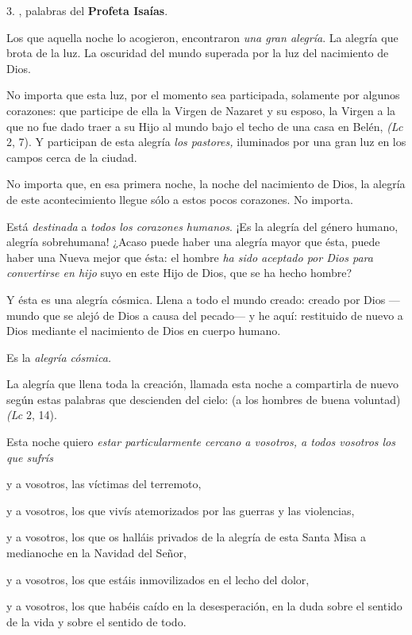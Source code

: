 3. , palabras del \textbf{Profeta Isaías}.

Los que aquella noche lo acogieron, encontraron \emph{una gran alegría}. La alegría que brota de la luz. La oscuridad del mundo superada por la luz del nacimiento de Dios.

No importa que esta luz, por el momento sea participada, solamente por algunos corazones: que participe de ella la Virgen de Nazaret y su esposo, la Virgen a la que no fue dado traer a su Hijo al mundo bajo el techo de una casa en Belén, \emph{(Lc} 2, 7). Y participan de esta alegría \emph{los pastores,} iluminados por una gran luz en los campos cerca de la ciudad.

No importa que, en esa primera noche, la noche del nacimiento de Dios, la alegría de este acontecimiento llegue sólo a estos pocos corazones. No importa.

Está \emph{destinada} a \emph{todos los corazones humanos}. ¡Es la alegría del género humano, alegría sobrehumana! ¿Acaso puede haber una alegría mayor que ésta, puede haber una Nueva mejor que ésta: el hombre \emph{ha sido aceptado por Dios para convertirse en hijo} suyo en este Hijo de Dios, que se ha hecho hombre?

Y ésta es una alegría cósmica. Llena a todo el mundo creado: creado por Dios ---mundo que se alejó de Dios a causa del pecado--- y he aquí: restituido de nuevo a Dios mediante el nacimiento de Dios en cuerpo humano.

Es la \emph{alegría cósmica. }

La alegría que llena toda la creación, llamada esta noche a compartirla de nuevo según estas palabras que descienden del cielo:  (a los hombres de buena voluntad) \emph{(Lc} 2, 14).

Esta noche quiero \emph{estar particularmente cercano a vosotros, a todos vosotros los que sufrís }

y a vosotros, las víctimas del terremoto,

y a vosotros, los que vivís atemorizados por las guerras y las violencias,

y a vosotros, los que os halláis privados de la alegría de esta Santa Misa a medianoche en la Navidad del Señor,

y a vosotros, los que estáis inmovilizados en el lecho del dolor,

y a vosotros, los que habéis caído en la desesperación, en la duda sobre el sentido de la vida y sobre el sentido de todo.


